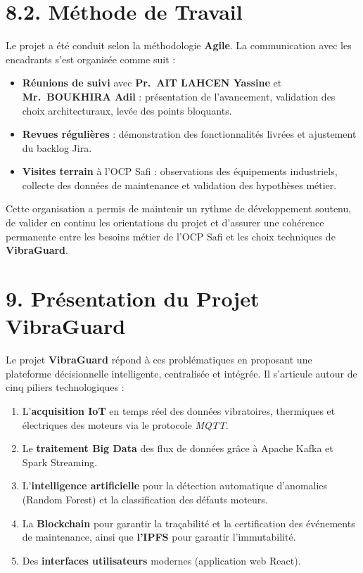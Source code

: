 \documentclass[12pt, a4paper, oneside]{report}
\newcommand{\projectname}{\textbf{VibraGuard}}
\newcommand{\tech}[1]{\textit{#1}}
\begin{document}
\section*{8.2. Méthode de Travail}

Le projet a été conduit selon la méthodologie \textbf{Agile}. La communication avec les encadrants s'est organisée
comme suit :

\begin{itemize}
  \item \textbf{Réunions de suivi} avec \textbf{Pr.~AIT LAHCEN Yassine} et
  \textbf{Mr.~BOUKHIRA Adil} : présentation de l'avancement, validation des choix
  architecturaux, levée des points bloquants.
  \item \textbf{Revues régulières} : démonstration des fonctionnalités livrées et ajustement du backlog Jira.
  \item \textbf{Visites terrain} à l'OCP Safi : observations des équipements industriels,
  collecte des données de maintenance et validation des hypothèses métier.
\end{itemize}

Cette organisation a permis de maintenir un rythme de développement soutenu, de valider
en continu les orientations du projet et d'assurer une cohérence permanente entre les
besoins métier de l'OCP Safi et les choix techniques de \projectname{}.

\section*{9. Présentation du Projet VibraGuard}

Le projet \projectname{} répond à ces problématiques en proposant une plateforme décisionnelle
intelligente, centralisée et intégrée. Il s'articule autour de cinq piliers technologiques :

\begin{enumerate}
  \item L'\textbf{acquisition IoT} en temps réel des données vibratoires, thermiques et
  électriques des moteurs via le protocole \tech{MQTT}.
  \item Le \textbf{traitement Big Data} des flux de données grâce à Apache Kafka et Spark Streaming.
  \item L'\textbf{intelligence artificielle} pour la détection automatique d'anomalies
  (Random Forest) et la classification des défauts moteurs.
  \item La \textbf{Blockchain} pour garantir la traçabilité et la
  certification des événements de maintenance, ainsi que \textbf{l'IPFS} pour garantir l'immutabilité.
  \item Des \textbf{interfaces utilisateurs} modernes (application web React).
\end{enumerate}
\end{document}

